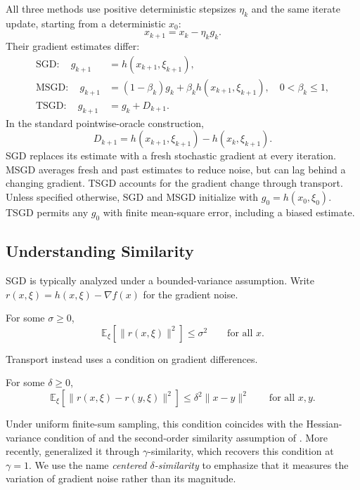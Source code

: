 All three methods use positive deterministic stepsizes $\eta_k$ and
the same iterate update, starting from a deterministic $x_0$:
\begin{equation}
\label{eq:tsgd-iterate}
x_{k+1}=x_k-\eta_k g_k.
\end{equation}
Their gradient estimates differ:
\begin{align}
\mathrm{SGD}:\quad g_{k+1}
  &=h(x_{k+1},\xi_{k+1}), \label{eq:sgd-estimate}\\
\mathrm{MSGD}:\quad g_{k+1}
  &=(1-\beta_k)g_k+\beta_k h(x_{k+1},\xi_{k+1}),
  \quad 0<\beta_k\leq1, \label{eq:msgd-estimate}\\
\mathrm{TSGD}:\quad g_{k+1}
  &=g_k+D_{k+1}. \label{eq:tsgd-estimate}
\end{align}
In the standard pointwise-oracle construction,
\begin{equation}
\label{eq:shared-sample-increment}
D_{k+1}=h(x_{k+1},\xi_{k+1})-h(x_k,\xi_{k+1}).
\end{equation}
SGD replaces its estimate with a fresh stochastic gradient at every
iteration. MSGD averages fresh and past estimates to reduce noise, but
can lag behind a changing gradient. TSGD accounts for the gradient change
through transport.
Unless specified otherwise, SGD and MSGD initialize with
$g_0=h(x_0,\xi_0)$. TSGD permits any $g_0$ with finite mean-square
error, including a biased estimate.

\subsection{Understanding Similarity}
\label{subsec:understanding-similarity}

SGD is typically analyzed under a bounded-variance assumption.
Write $r(x,\xi)=h(x,\xi)-\nabla f(x)$ for the gradient noise.
\begin{assumption}
\label{ass:bounded-variance}
For some $\sigma\geq0$,
\begin{equation}
\label{eq:bounded-variance}
\mathbb E_{\xi}[\|r(x,\xi)\|^2]\leq\sigma^2
\qquad\text{for all }x.
\end{equation}
\end{assumption}
Transport instead uses a condition on gradient differences.
\begin{assumption}
\label{ass:oracle-similarity}
For some $\delta\geq0$,
\begin{equation}
\label{eq:oracle-similarity}
\mathbb E_{\xi}[\|r(x,\xi)-r(y,\xi)\|^2]
\leq\delta^2\|x-y\|^2
\qquad\text{for all }x,y.
\end{equation}
\end{assumption}
Under uniform finite-sum sampling, this condition coincides with the
Hessian-variance condition of
\citet{szlendak2021permutationcompressorsprovablyfaster} and the
second-order similarity assumption of
\citet{khaled2023fasterfederatedoptimizationsecondorder}.
More recently, \citet{pmlr-v306-shulgin26b} generalized it through
$\gamma$-similarity, which recovers this condition at $\gamma=1$.
We use the name \emph{centered $\delta$-similarity} to emphasize that it
measures the variation of gradient noise rather than its magnitude.


